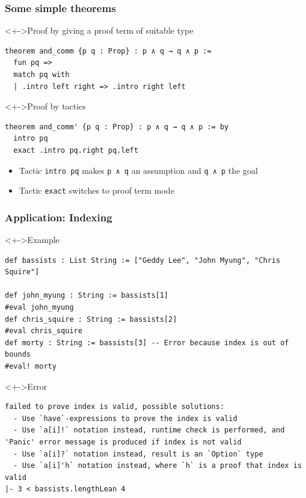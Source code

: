 \documentclass{beamer}
\begin{document}
\begin{frame}[fragile]
  \frametitle{Some simple theorems}
  \begin{block}<+->{Proof by giving a proof term of suitable type}
\begin{lstlisting}
theorem and_comm {p q : Prop} : p ∧ q → q ∧ p :=
  fun pq =>
  match pq with
  | .intro left right => .intro right left
\end{lstlisting}
  \end{block}
  \begin{block}<+->{Proof by tactics}
\begin{lstlisting}
theorem and_comm' {p q : Prop} : p ∧ q → q ∧ p := by
  intro pq
  exact .intro pq.right pq.left
\end{lstlisting}
    \begin{itemize}
    \item Tactic \lstinline{intro pq} makes \lstinline{p ∧ q} an assumption and
      \lstinline{q ∧ p} the goal
    \item Tactic \lstinline{exact} switches to proof term mode
    \end{itemize}
  \end{block}
\end{frame}
\begin{frame}[fragile]
  \frametitle{Application: Indexing}
  \begin{block}<+->{Example}
\begin{lstlisting}
def bassists : List String := ["Geddy Lee", "John Myung", "Chris Squire"]

def john_myung : String := bassists[1]
#eval john_myung
def chris_squire : String := bassists[2]
#eval chris_squire
def morty : String := bassists[3] -- Error because index is out of bounds
#eval! morty
\end{lstlisting}
  \end{block}
  \begin{alertblock}<+->{Error}\small
\begin{verbatim}
failed to prove index is valid, possible solutions:
  - Use `have`-expressions to prove the index is valid
  - Use `a[i]!` notation instead, runtime check is performed, and 'Panic' error message is produced if index is not valid
  - Use `a[i]?` notation instead, result is an `Option` type
  - Use `a[i]'h` notation instead, where `h` is a proof that index is valid
|- 3 < bassists.lengthLean 4
\end{verbatim}
  \end{alertblock}
\end{frame}
\end{document}
